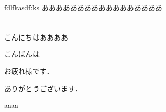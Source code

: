 \documentclass[dvipdfmx,report,11pt]{jsarticle}
\title{}
\author{funaki}
\date{\today}
\begin{document}
\newcommand{\ctext}[1]{\raise0.2ex\hbox{\textcircled{\scriptsize{#1}}}}
\maketitle

fdlfkasdf:ks
あああああああああああああああああ
\section{}
こんにちはああああ

こんばんは

お疲れ様です．

ありがとうございます．

aaaa
\end{document}

